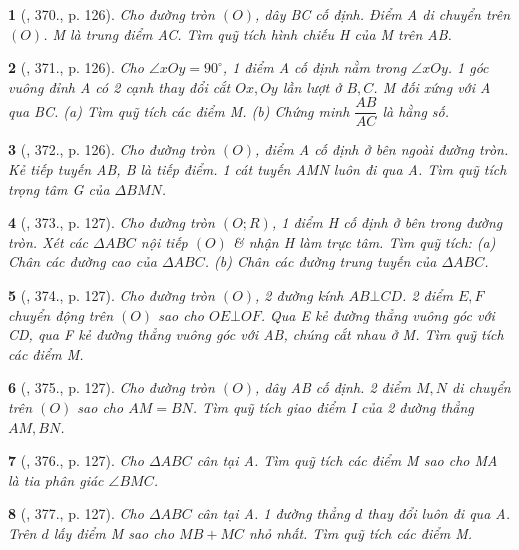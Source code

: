 \documentclass{article}
\newtheorem{baitoan}{}
\begin{document}
\begin{baitoan}[\cite{Binh_Toan_9_tap_2}, 370., p. 126]
	Cho đường tròn $(O)$, dây BC cố định. Điểm A di chuyển trên $(O)$. M là trung điểm AC. Tìm quỹ tích hình chiếu H của M trên AB.
\end{baitoan}

\begin{baitoan}[\cite{Binh_Toan_9_tap_2}, 371., p. 126]
	Cho $\angle{xOy} = 90^\circ$, 1 điểm A cố định nằm trong $\angle{xOy}$. 1 góc vuông đỉnh A có 2 cạnh thay đổi cắt $Ox,Oy$ lần lượt ở $B,C$. M đối xứng với A qua BC. (a) Tìm quỹ tích các điểm M. (b) Chứng minh $\dfrac{AB}{AC}$ là hằng số.
\end{baitoan}

\begin{baitoan}[\cite{Binh_Toan_9_tap_2}, 372., p. 126]
	Cho đường tròn $(O)$, điểm A cố định ở bên ngoài đường tròn. Kẻ tiếp tuyến AB, B là tiếp điểm. 1 cát tuyến AMN luôn đi qua A. Tìm quỹ tích trọng tâm G của $\Delta BMN$.
\end{baitoan}

\begin{baitoan}[\cite{Binh_Toan_9_tap_2}, 373., p. 127]
	Cho đường tròn $(O;R)$, 1 điểm H cố định ở bên trong đường tròn. Xét các $\Delta ABC$ nội tiếp $(O)$ \& nhận H làm trực tâm. Tìm quỹ tích: (a) Chân các đường cao của $\Delta ABC$. (b) Chân các đường trung tuyến của $\Delta ABC$.
\end{baitoan}

\begin{baitoan}[\cite{Binh_Toan_9_tap_2}, 374., p. 127]
	Cho đường tròn $(O)$, 2 đường kính $AB\bot CD$. 2 điểm $E,F$ chuyển động trên $(O)$ sao cho $OE\bot OF$. Qua E kẻ đường thẳng vuông góc với CD, qua F kẻ đường thẳng vuông góc với AB, chúng cắt nhau ở M. Tìm quỹ tích các điểm M.
\end{baitoan}

\begin{baitoan}[\cite{Binh_Toan_9_tap_2}, 375., p. 127]
	Cho đường tròn $(O)$, dây AB cố định. 2 điểm $M,N$ di chuyển trên $(O)$ sao cho $AM = BN$. Tìm quỹ tích giao điểm I của 2 đường thẳng $AM,BN$.
\end{baitoan}

\begin{baitoan}[\cite{Binh_Toan_9_tap_2}, 376., p. 127]
	Cho $\Delta ABC$ cân tại A. Tìm quỹ tích các điểm M sao cho MA là tia phân giác $\angle{BMC}$.
\end{baitoan}

\begin{baitoan}[\cite{Binh_Toan_9_tap_2}, 377., p. 127]
	Cho $\Delta ABC$ cân tại A. 1 đường thẳng $d$ thay đổi luôn đi qua A. Trên $d$ lấy điểm M sao cho $MB + MC$ nhỏ nhất. Tìm quỹ tích các điểm M.
\end{baitoan}
\end{document}
